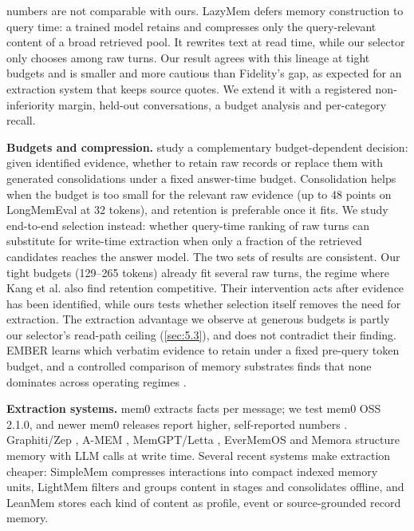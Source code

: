 \documentclass[11pt]{article}
\newcommand{\src}[1]{}
\begin{document}
numbers are not comparable with ours. LazyMem \citep{yu2026lazymem} defers memory construction to query time: a trained model retains and compresses only the query-relevant content of a broad retrieved pool. It rewrites text at read time, while our selector only chooses among raw turns. Our result agrees with this lineage at tight budgets and is smaller and more cautious than Fidelity's gap, as expected for an extraction system that keeps source quotes. We extend it with a registered non-inferiority margin, held-out conversations, a budget analysis and per-category recall.

\textbf{Budgets and compression.} \citet{kang2026retain} study a complementary budget-dependent decision: given identified evidence, whether to retain raw records or replace them with generated consolidations under a fixed answer-time budget. Consolidation helps when the budget is too small for the relevant raw evidence (up to 48\src{cite:kang2026retain (checked against the paper's text; paper\_v3/bib\_verification.md)} points on LongMemEval at 32\src{cite:kang2026retain (checked against the paper's text; paper\_v3/bib\_verification.md)} tokens), and retention is preferable once it fits. We study end-to-end selection instead: whether query-time ranking of raw turns can substitute for write-time extraction when only a fraction of the retrieved candidates reaches the answer model. The two sets of results are consistent. Our tight budgets (129\src{bench/results/v3/batch\_b\_report.json\#fresh/mem0 k3/tokens\_mean}--265\src{bench/results/v3/batch\_b\_report.json\#fresh/T0R k6 (matched to engram v2)/tokens\_mean} tokens) already fit several raw turns, the regime where Kang et al. also find retention competitive. Their intervention acts after evidence has been identified, while ours tests whether selection itself removes the need for extraction. The extraction advantage we observe at generous budgets is partly our selector's read-path ceiling (\cref{sec:5.3}), and does not contradict their finding. EMBER \citep{li2026ember} learns which verbatim evidence to retain under a fixed pre-query token budget, and a controlled comparison of memory substrates finds that none dominates across operating regimes \citep{huang2026harness}.

\textbf{Extraction systems.} mem0 \citep{chhikara2025mem0} extracts facts per message; we test mem0 OSS 2.1.0, and newer mem0 releases report higher, self-reported numbers \citep{mem02026state}. Graphiti/Zep \citep{rasmussen2025zep}, A-MEM \citep{xu2025amem}, MemGPT/Letta \citep{packer2023memgpt}, EverMemOS \citep{evermemos2026} and Memora \citep{memora2026} structure memory with LLM calls at write time. Several recent systems make extraction cheaper: SimpleMem \citep{liu2026simplemem} compresses interactions into compact indexed memory units, LightMem \citep{fang2025lightmem} filters and groups content in stages and consolidates offline, and LeanMem \citep{liao2026leanmem} stores each kind of content as profile, event or source-grounded record memory.
\end{document}
